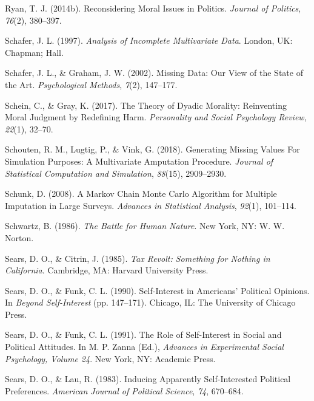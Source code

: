 \documentclass[12pt,econ]{sources/authesis}
\begin{document}
\leavevmode\hypertarget{ref-ryan_reconsidering_2014}{}%
Ryan, T. J. (2014b). Reconsidering Moral Issues in Politics. \emph{Journal of Politics}, \emph{76}(2), 380--397.

\leavevmode\hypertarget{ref-schafer_1997_analysis}{}%
Schafer, J. L. (1997). \emph{Analysis of Incomplete Multivariate Data}. London, UK: Chapman; Hall.

\leavevmode\hypertarget{ref-schafer_2002_missing}{}%
Schafer, J. L., \& Graham, J. W. (2002). Missing Data: Our View of the State of the Art. \emph{Psychological Methods}, \emph{7}(2), 147--177.

\leavevmode\hypertarget{ref-schein_2017_theory}{}%
Schein, C., \& Gray, K. (2017). The Theory of Dyadic Morality: Reinventing Moral Judgment by Redefining Harm. \emph{Personality and Social Psychology Review}, \emph{22}(1), 32--70.

\leavevmode\hypertarget{ref-schouten_2018_generating}{}%
Schouten, R. M., Lugtig, P., \& Vink, G. (2018). Generating Missing Values For Simulation Purposes: A Multivariate Amputation Procedure. \emph{Journal of Statistical Computation and Simulation}, \emph{88}(15), 2909--2930.

\leavevmode\hypertarget{ref-schunk_2008_markov}{}%
Schunk, D. (2008). A Markov Chain Monte Carlo Algorithm for Multiple Imputation in Large Surveys. \emph{Advances in Statistical Analysis}, \emph{92}(1), 101--114.

\leavevmode\hypertarget{ref-schwartz_battle_1986}{}%
Schwartz, B. (1986). \emph{The Battle for Human Nature}. New York, NY: W. W. Norton.

\leavevmode\hypertarget{ref-sears_tax_1985}{}%
Sears, D. O., \& Citrin, J. (1985). \emph{Tax Revolt: Something for Nothing in California}. Cambridge, MA: Harvard University Press.

\leavevmode\hypertarget{ref-sears_self-interest_1990}{}%
Sears, D. O., \& Funk, C. L. (1990). Self-Interest in Americans' Political Opinions. In \emph{Beyond Self-Interest} (pp. 147--171). Chicago, IL: The University of Chicago Press.

\leavevmode\hypertarget{ref-sears_role_1991}{}%
Sears, D. O., \& Funk, C. L. (1991). The Role of Self-Interest in Social and Political Attitudes. In M. P. Zanna (Ed.), \emph{Advances in Experimental Social Psychology, Volume 24}. New York, NY: Academic Press.

\leavevmode\hypertarget{ref-sears_inducing_1983}{}%
Sears, D. O., \& Lau, R. (1983). Inducing Apparently Self-Interested Political Preferences. \emph{American Journal of Political Science}, \emph{74}, 670--684.
\end{document}
